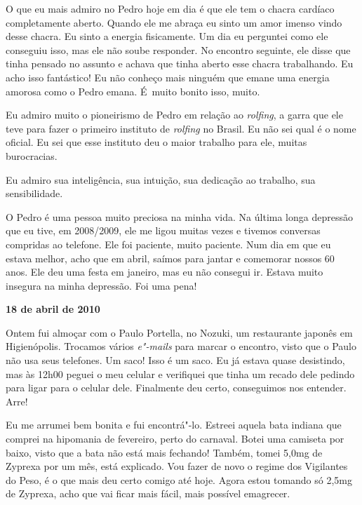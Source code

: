 O que eu mais admiro no Pedro hoje em dia é que ele tem o chacra
cardíaco completamente aberto. Quando ele me abraça eu sinto um amor
imenso vindo desse chacra. Eu sinto a energia fisicamente. Um dia eu
perguntei como ele conseguiu isso, mas ele não soube responder. No
encontro seguinte, ele disse que tinha pensado no assunto e achava que
tinha aberto esse chacra trabalhando. Eu acho isso fantástico! Eu não
conheço mais ninguém que emane uma energia amorosa como o Pedro emana. É~muito bonito isso, muito.

Eu admiro muito o pioneirismo de Pedro em relação ao \emph{rolfing}, a
garra que ele teve para fazer o primeiro instituto de \emph{rolfing} no
Brasil. Eu não sei qual é o nome oficial. Eu sei que esse instituto deu
o maior trabalho para ele, muitas burocracias.

Eu admiro sua inteligência, sua intuição, sua dedicação ao trabalho, sua
sensibilidade.

O Pedro é uma pessoa muito preciosa na minha vida. Na última longa
depressão que eu tive, em 2008/2009, ele me ligou muitas vezes e tivemos
conversas compridas ao telefone. Ele foi paciente, muito paciente. Num
dia em que eu estava melhor, acho que em abril, saímos para jantar e
comemorar nossos 60 anos. Ele deu uma festa em janeiro, mas eu não
consegui ir. Estava muito insegura na minha depressão. Foi uma pena!

\begin{center}\textbf{\asterisc{}}\end{center}

\begin{flushright}\textbf{18 de abril de 2010}\end{flushright}


Ontem fui almoçar com o Paulo Portella, no Nozuki, um restaurante
japonês em Higienópolis. Trocamos vários \emph{e"-mails} para marcar o
encontro, visto que o Paulo não usa seus telefones. Um saco! Isso é um
saco. Eu já estava quase desistindo, mas às 12h00 peguei o meu celular e
verifiquei que tinha um recado dele pedindo para ligar para o celular
dele. Finalmente deu certo, conseguimos nos entender. Arre!

Eu me arrumei bem bonita e fui encontrá"-lo. Estreei aquela bata indiana
que comprei na hipomania de fevereiro, perto do carnaval. Botei uma
camiseta por baixo, visto que a bata não está mais fechando!
Também, tomei 5,0mg de Zyprexa por um mês, está explicado. Vou fazer de
novo o regime dos Vigilantes do Peso, é o que mais deu certo comigo até
hoje. Agora estou tomando só 2,5mg de Zyprexa, acho que vai ficar mais
fácil, mais possível emagrecer.


